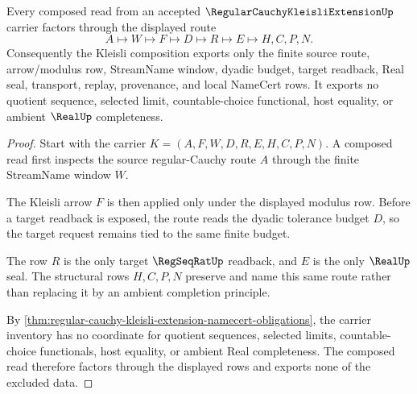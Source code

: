 \begin{theorem}
\label{thm:regular-cauchy-kleisli-extension-composition-law}
Every composed read from an accepted $\RegularCauchyKleisliExtensionUp$ carrier factors through the displayed route
$$
A \longmapsto W \longmapsto F \longmapsto D \longmapsto R \longmapsto E \longmapsto H,C,P,N .
$$
Consequently the Kleisli composition exports only the finite source route, arrow/modulus row, StreamName window, dyadic budget, target readback, Real seal, transport, replay, provenance, and local NameCert rows. It exports no quotient sequence, selected limit, countable-choice functional, host equality, or ambient $\RealUp$ completeness.
\end{theorem}
\begin{proof}
Start with the carrier $K=(A,F,W,D,R,E,H,C,P,N)$. A composed read first inspects the source regular-Cauchy route $A$ through the finite StreamName window $W$.

The Kleisli arrow $F$ is then applied only under the displayed modulus row. Before a target readback is exposed, the route reads the dyadic tolerance budget $D$, so the target request remains tied to the same finite budget.

The row $R$ is the only target $\RegSeqRatUp$ readback, and $E$ is the only $\RealUp$ seal. The structural rows $H,C,P,N$ preserve and name this same route rather than replacing it by an ambient completion principle.

By \autoref{thm:regular-cauchy-kleisli-extension-namecert-obligations}, the carrier inventory has no coordinate for quotient sequences, selected limits, countable-choice functionals, host equality, or ambient Real completeness. The composed read therefore factors through the displayed rows and exports none of the excluded data.
\end{proof}


